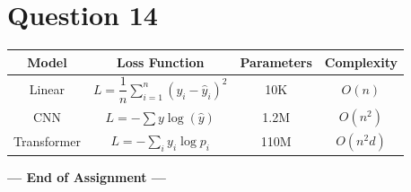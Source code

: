 \documentclass[12pt,a4paper]{article}
\begin{document}
	\section*{Question 14}
	
	\begin{center}
		\begin{tabular}{|c|c|c|c|}
			\hline
			\textbf{Model} &
			\textbf{Loss Function} &
			\textbf{Parameters} &
			\textbf{Complexity} \\
			\hline
			
			Linear &
			$L = \dfrac{1}{n}
			\sum_{i=1}^{n}(y_i - \hat{y}_i)^2$ &
			10K &
			$O(n)$ \\
			\hline
			
			CNN &
			$L = -\sum y\log(\hat{y})$ &
			1.2M &
			$O(n^2)$ \\
			\hline
			
			Transformer &
			$L = -\sum_i y_i\log p_i$ &
			110M &
			$O(n^2d)$ \\
			\hline
		\end{tabular}
	\end{center}
	
	\begin{center}
		\textbf{--- End of Assignment ---}
	\end{center}
	
\end{document}

